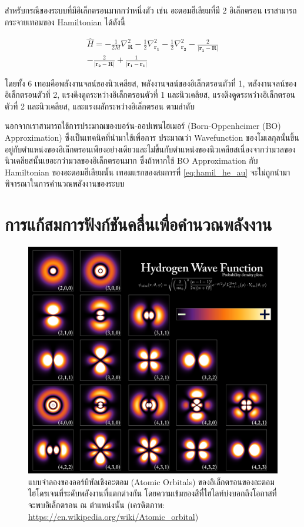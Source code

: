 สำหรับกรณีของระบบที่มีอิเล็กตรอนมากกว่าหนึ่งตัว เช่น อะตอมฮีเลียมที่มี 2 อิเล็กตรอน เราสามารถกระจายเทอมของ Hamiltonian ได้ดังนี้

\begin{multline}\label{eq:hamil_he_au}
    \hat{H} = -\frac{1}{2M} \nabla^{2}_{\bm{R}}
    -\frac{1}{2} \nabla^{2}_{\bm{r_{1}}}
    -\frac{1}{2} \nabla^{2}_{\bm{r_{2}}}
    -\frac{2}{|\bm{r_{1}}-\bm{R}|}
    \\
    -\frac{2}{|\bm{r_{2}}-\bm{R}|}
    +\frac{1}{|\bm{r_{1}}-\bm{r_{1}}|}
\end{multline}

\noindent โดยทั้ง 6 เทอมคือพลังงานจลน์ของนิวเคลียส, พลังงานจลน์ของอิเล็กตรอนตัวที่ 1, พลังงานจลน์ของอิเล็กตรอนตัวที่ 2,
แรงดึงดูดระหว่างอิเล็กตรอนตัวที่ 1 และนิวเคลียส, แรงดึงดูดระหว่างอิเล็กตรอนตัวที่ 2 และนิวเคลียส, และแรงผลักระหว่างอิเล็กตรอน ตามลำดับ

นอกจากเราสามารถใช้การประมาณของบอร์น-ออปเพนไฮเมอร์ (Born-Oppenheimer (BO) Approximation) ซึ่งเป็นเทคนิคที่นำมาใช้เพื่อการ%
ประมาณว่า Wavefunction ของโมเลกุลนั้นขึ้นอยู่กับตำแหน่งของอิเล็กตรอนเพียงอย่างเดียวและไม่ขึ้นกับตำแหน่งของนิวเคลียสเนื่องจากว่ามวลของ%
นิวเคลียสนั้นเยอะกว่ามวลของอิเล็กตรอนมาก ซึ่งถ้าหากใช้ BO Approximation กับ Hamiltonian ของอะตอมฮีเลียมนั้น เทอมแรกของสมการที่
\eqref{eq:hamil_he_au} จะไม่ถูกนำมาพิจารณาในการคำนวณพลังงานของระบบ

\section{การแก้สมการฟังก์ชันคลื่นเพื่อคำนวณพลังงาน}
\label{sec:wavefunc_ener}

\begin{figure}[H]
    \centering
    \includegraphics[width=0.9\linewidth]{fig/hydrogen_density_plots.png}
    \caption{แบบจำลองของออร์บิทัลเชิงอะตอม (Atomic Orbitals) ของอิเล็กตรอนของอะตอมไฮโดรเจนที่ระดับพลังงานที่แตกต่างกัน
        โดยความเข้มของสีที่ไฮไลท์บ่งบอกถึงโอกาสที่จะพบอิเล็กตรอน ณ ตำแหน่งนั้น
        (เครดิตภาพ: \url{https://en.wikipedia.org/wiki/Atomic_orbital})}
    \label{fig:hydrogen_density}
\end{figure}

